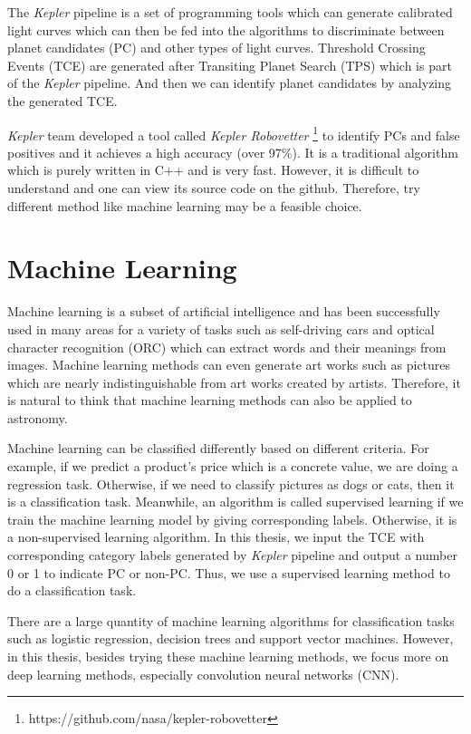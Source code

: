     The \textit{Kepler} pipeline is a set of programming tools which can generate
    calibrated light curves which can then be fed into the
    algorithms to discriminate between planet candidates (PC) and other types of light curves.
    Threshold Crossing Events (TCE) are generated
    after Transiting Planet Search (TPS) which is part of 
    the \textit{Kepler} pipeline. And then we can identify planet candidates
    by analyzing the generated TCE. 

    \textit{Kepler} team developed a tool called \textit{Kepler Robovetter} 
    \footnote{https://github.com/nasa/kepler-robovetter}
    to identify PCs and false positives and it achieves a high accuracy (over 97\%).
    It is a traditional algorithm which is purely written in C++ and 
    is very fast. However, it is difficult to understand
    and one can view its source code on the github. Therefore, try different method like 
    machine learning may be a feasible choice.
  
  \section{Machine Learning}
      Machine learning is a subset of artificial intelligence and has been successfully used 
      in many areas for a variety of tasks such as self-driving cars and optical character
      recognition (ORC) which can extract words and their meanings from images. Machine 
      learning methods can even generate art works such as pictures which are nearly 
      indistinguishable from art works created by artists. Therefore, it is natural to think 
      that machine learning methods can also be applied to astronomy. 

      Machine learning can be classified differently based on different criteria. For example,
      if we predict a product's price which is a concrete value, we are doing a regression task. 
      Otherwise, if we need to classify pictures as dogs or cats, then it is a classification 
      task. Meanwhile, an algorithm is called supervised learning if we train the machine 
      learning model by giving corresponding labels. Otherwise, it is a 
      non-supervised learning algorithm. In this thesis, we input the TCE with 
      corresponding category labels generated by 
      \textit{Kepler} pipeline and output a number 0 or 1 to indicate PC or non-PC. Thus,
      we use a supervised learning method to do a classification task.

      There are a large quantity of machine learning algorithms for classification tasks
      such as logistic regression, decision trees and support vector machines. However, 
      in this thesis, besides trying these machine learning methods, we 
      focus more on deep learning methods, especially convolution neural networks (CNN).


  